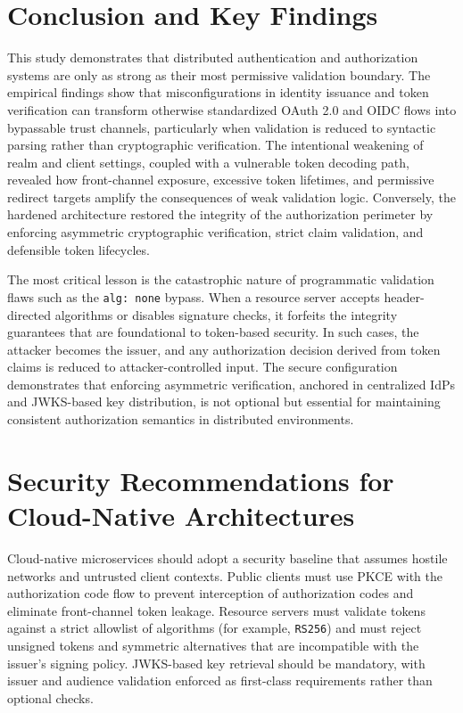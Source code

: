 \documentclass[11pt,a4paper]{report}
\begin{document}
\section{Conclusion and Key Findings}
\label{sec:conclusion}
This study demonstrates that distributed authentication and authorization systems are only as strong as their most permissive validation boundary. The empirical findings show that misconfigurations in identity issuance and token verification can transform otherwise standardized OAuth 2.0 and OIDC flows into bypassable trust channels, particularly when validation is reduced to syntactic parsing rather than cryptographic verification. The intentional weakening of realm and client settings, coupled with a vulnerable token decoding path, revealed how front-channel exposure, excessive token lifetimes, and permissive redirect targets amplify the consequences of weak validation logic. Conversely, the hardened architecture restored the integrity of the authorization perimeter by enforcing asymmetric cryptographic verification, strict claim validation, and defensible token lifecycles.

The most critical lesson is the catastrophic nature of programmatic validation flaws such as the \texttt{alg: none} bypass. When a resource server accepts header-directed algorithms or disables signature checks, it forfeits the integrity guarantees that are foundational to token-based security. In such cases, the attacker becomes the issuer, and any authorization decision derived from token claims is reduced to attacker-controlled input. The secure configuration demonstrates that enforcing asymmetric verification, anchored in centralized IdPs and JWKS-based key distribution, is not optional but essential for maintaining consistent authorization semantics in distributed environments.

\section{Security Recommendations for Cloud-Native Architectures}
\label{sec:recommendations}
Cloud-native microservices should adopt a security baseline that assumes hostile networks and untrusted client contexts. Public clients must use PKCE with the authorization code flow to prevent interception of authorization codes and eliminate front-channel token leakage. Resource servers must validate tokens against a strict allowlist of algorithms (for example, \texttt{RS256}) and must reject unsigned tokens and symmetric alternatives that are incompatible with the issuer's signing policy. JWKS-based key retrieval should be mandatory, with issuer and audience validation enforced as first-class requirements rather than optional checks.
\end{document}
